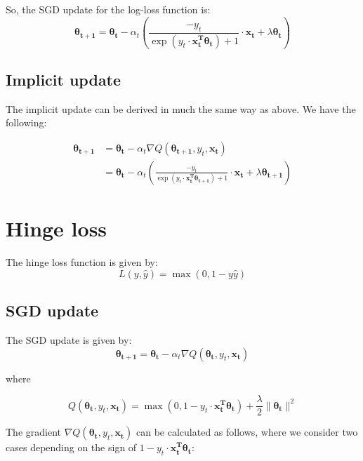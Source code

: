 \documentclass{article}
\renewcommand{\vec}[1]{\boldsymbol{#1}}
\begin{document}
So, the SGD update for the log-loss function is:
\begin{equation}
\vec{\theta_{t+1}} = \vec{\theta_{t}} - \alpha_{t}\left( \frac{-y_t}{\exp(y_t\cdot\vec{x_t^{T}}\vec{\theta_t})+1}\cdot\vec{x_t} + \lambda\vec{\theta_t} \right)
\end{equation}


\subsection{Implicit update}
The implicit update can be derived in much the same way as above. We have the following:

\begin{align*}
\vec{\theta_{t+1}} &= \vec{\theta_t} - \alpha_t \nabla Q(\vec{\theta_{t+1}}, y_t, \vec{x_t})\\
&= \vec{\theta_t} - \alpha_t \left(\frac{-y_t}{\exp(y_t\cdot\vec{x_t^{T}}\vec{\theta_{t+1}})+1}\cdot\vec{x_t} + \lambda\vec{\theta_{t+1}} \right)
\end{align*}


\section{Hinge loss}
The hinge loss function is given by:
\begin{equation}
L(y, \hat{y}) = \max(0, 1-y\hat{y})
\end{equation}
\subsection{SGD update}
The SGD update is given by:
\begin{equation}
\vec{\theta_{t+1}} = \vec{\theta_{t}} - \alpha_{t}\nabla Q(\vec{\theta_{t}}, y_t, \vec{x_t})
\end{equation}

where

\begin{equation}
Q(\vec{\theta_{t}}, y_t, \vec{x_t}) = \max(0, 1-y_t\cdot\vec{x_t^{T}}\vec{\theta_t}) + \frac{\lambda}{2}\|\vec{\theta_t}\|^2
\end{equation}

The gradient $\nabla Q(\vec{\theta_{t}}, y_t, \vec{x_t})$ can be calculated as follows, where we consider two cases depending on the sign of $1-y_t\cdot\vec{x_t^{T}}\vec{\theta_t}$:
\end{document}
